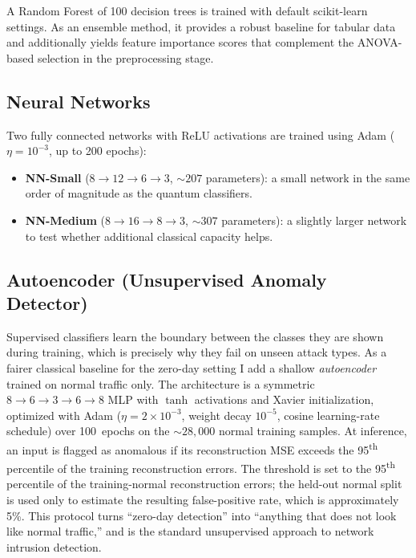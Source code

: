 A Random Forest of 100 decision trees is trained with default scikit-learn settings. As an ensemble method, it provides a robust baseline for tabular data and additionally yields feature importance scores that complement the ANOVA-based selection in the preprocessing stage.

\subsection{Neural Networks}

Two fully connected networks with ReLU activations are trained using Adam ($\eta = 10^{-3}$, up to 200 epochs):
\begin{itemize}[nosep]
    \item \textbf{NN-Small} ($8 \to 12 \to 6 \to 3$, ${\sim}207$ parameters): a small network in the same order of magnitude as the quantum classifiers.
    \item \textbf{NN-Medium} ($8 \to 16 \to 8 \to 3$, ${\sim}307$ parameters): a slightly larger network to test whether additional classical capacity helps.
\end{itemize}

\subsection{Autoencoder (Unsupervised Anomaly Detector)}
\label{sec:impl_autoencoder}

Supervised classifiers learn the boundary between the classes they are shown during training, which is precisely why they fail on unseen attack types. As a fairer classical baseline for the zero-day setting I add a shallow \emph{autoencoder} trained on normal traffic only. The architecture is a symmetric $8 \to 6 \to 3 \to 6 \to 8$ MLP with $\tanh$ activations and Xavier initialization, optimized with Adam ($\eta = 2 \times 10^{-3}$, weight decay $10^{-5}$, cosine learning-rate schedule) over 100~epochs on the ${\sim}28{,}000$ normal training samples. At inference, an input is flagged as anomalous if its reconstruction MSE exceeds the 95\textsuperscript{th} percentile of the training reconstruction errors. The threshold is set to the 95\textsuperscript{th} percentile of the training-normal reconstruction errors; the held-out normal split is used only to estimate the resulting false-positive rate, which is approximately 5\%. This protocol turns ``zero-day detection'' into ``anything that does not look like normal traffic,'' and is the standard unsupervised approach to network intrusion detection.

